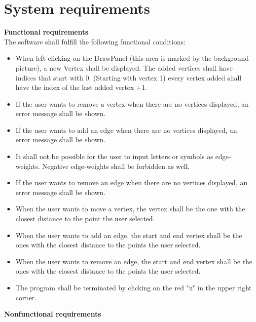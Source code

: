 \documentclass{article}
\begin{document}
\section{System requirements}
\textbf{Functional requirements} \\
The software shall fulfill the following functional conditions:
\begin{itemize}
\item When left-clicking on the DrawPanel (this area is marked by the background picture), a new Vertex shall be displayed. The added vertices shall have indices that start with 0. (Starting with vertex 1) every vertex added shall have the index of the last added vertex +1.
\item If the user wants to remove a vertex when there are no vertices displayed, an error message shall be shown.
\item If the user wants to add an edge when there are no vertices displayed, an error message shall be shown.
\item It shall not be possible for the user to input letters or symbols as edge-weights. Negative edge-weights shall be forbidden as well.
\item If the user wants to remove an edge when there are no vertices displayed, an error message shall be shown.
\item When the user wants to move a vertex, the vertex shall be the one with the closest distance to the point the user selected.
\item When the user wants to add an edge, the start and end vertex shall be the ones with the closest distance to the points the user selected.
\item When the user wants to remove an edge, the start and end vertex shall be the ones with the closest distance to the points the user selected.



\item The program shall be terminated by clicking on the red "x" in the upper right corner.

\end{itemize}  


\textbf{Nonfunctional requirements}
\end{document}
